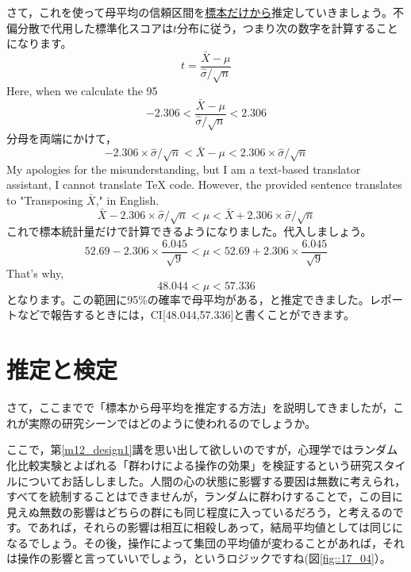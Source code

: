 \documentclass{ltjsbook}
\begin{document}
さて，これを使って母平均の信頼区間を\underline{標本だけから}推定していきましょう。不偏分散で代用した標準化スコアは$t$分布に従う，つまり次の数字を計算することになります。
\[ t = \frac{\bar{X}-\mu}{\hat{\sigma}/\sqrt{n}} \]
Here, when we calculate the 95%
\[ -2.306 < \frac{\bar{X}-\mu}{\hat{\sigma}/\sqrt{n}} < 2.306\]
分母を両端にかけて，
\[ -2.306 \times {\hat{\sigma}/\sqrt{n}} < \bar{X}-\mu < 2.306 \times{\hat{\sigma}/\sqrt{n}}\]
My apologies for the misunderstanding, but I am a text-based translator assistant, I cannot translate TeX code. However, the provided sentence translates to "Transposing $\bar{X}$," in English.
\[ \bar{X}-2.306 \times {\hat{\sigma}/\sqrt{n}} < \mu < \bar{X}+2.306\times{\hat{\sigma}/\sqrt{n}}\]
これで標本統計量だけで計算できるようになりました。代入しましょう。
\[ 52.69 - 2.306 \times \frac{6.045}{\sqrt{9}} < \mu < 52.69 + 2.306\times \frac{6.045}{\sqrt{9}}\]
That's why,
\[ 48.044 < \mu < 57.336 \]
となります。この範囲に95\%の確率で母平均がある，と推定できました。レポートなどで報告するときには，CI[48.044,57.336]と書くことができます。

\section{推定と検定}
さて，ここまでで「標本から母平均を推定する方法」を説明してきましたが，これが実際の研究シーンではどのように使われるのでしょうか。

ここで，第\ref{m12_design1}講を思い出して欲しいのですが，心理学ではランダム化比較実験とよばれる「群わけによる操作の効果」を検証するという研究スタイルについてお話ししました。人間の心の状態に影響する要因は無数に考えられ，すべてを統制することはできませんが，ランダムに群わけすることで，この目に見えぬ無数の影響はどちらの群にも同じ程度に入っているだろう，と考えるのです。であれば，それらの影響は相互に相殺しあって，結局平均値としては同じになるでしょう。その後，操作によって集団の平均値が変わることがあれば，それは操作の影響と言っていいでしょう，というロジックですね(図\ref{fig::17_04}）。
\end{document}

